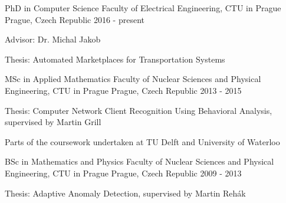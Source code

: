 

\begin{cventries}

  \cventry
    {PhD in Computer Science} %
    {Faculty of Electrical Engineering, CTU in Prague} %
    {Prague, Czech Republic} %
    {2016 - present} %
    {
      \begin{cvitems} %
        \item {Advisor: Dr. Michal Jakob}
        \item {Thesis: Automated Marketplaces for Transportation Systems}
      \end{cvitems}
    }


  \cventry
    {MSc in Applied Mathematics} %
    {Faculty of Nuclear Sciences and Physical Engineering, CTU in Prague} %
    {Prague, Czech Republic} %
    {2013 - 2015} %
    {
      \begin{cvitems} %
        \item {Thesis: Computer Network Client Recognition Using Behavioral Analysis, supervised by Martin Grill}
        \item {Parts of the coursework undertaken at TU Delft and University of Waterloo}
      \end{cvitems}
    }

  \cventry
    {BSc in Mathematics and Physics} %
    {Faculty of Nuclear Sciences and Physical Engineering, CTU in Prague} %
    {Prague, Czech Republic} %
    {2009 - 2013} %
    {
      \begin{cvitems} %
        \item {Thesis: Adaptive Anomaly Detection, supervised by Martin Rehák }
      \end{cvitems}
    }

\end{cventries}
